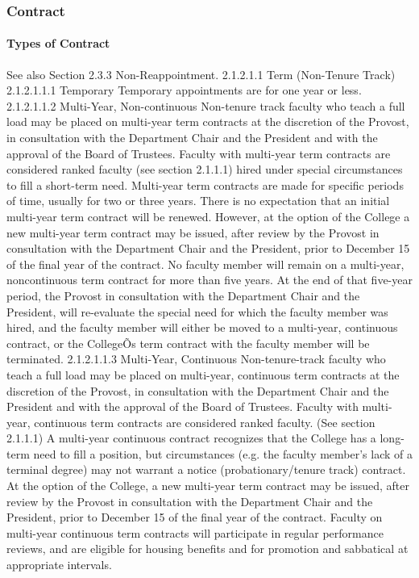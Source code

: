\documentclass[letterpaper, 11pt]{article}
\begin{document}
		\subsubsection{Contract}
			\paragraph{Types of Contract}
				See also Section 2.3.3 Non-Reappointment.
				2.1.2.1.1 Term (Non-Tenure Track)
				2.1.2.1.1.1 Temporary
				Temporary appointments are for one year or less.
				2.1.2.1.1.2 Multi-Year, Non-continuous
				Non-tenure track faculty who teach a full load may be placed on multi-year term contracts at the discretion of the Provost, in consultation with the Department Chair and the President and with the approval of the Board of Trustees.  Faculty with multi-year term contracts are considered ranked faculty (see section 2.1.1.1) hired under special circumstances to fill a short-term need.  Multi-year term contracts are made for specific periods of time, usually for two or three years.  There is no expectation that an initial multi-year term contract will be renewed.  However, at the option of the College a new multi-year term contract may be issued, after review by the Provost in consultation with the Department Chair and the President, prior to December 15 of the final year of the contract.  No faculty member will remain on a multi-year, noncontinuous term contract for more than five years.  At the end of that five-year period, the Provost in consultation with the Department Chair and the President, will re-evaluate the special need for which the faculty member was hired, and the faculty member will either be moved to a multi-year, continuous contract, or the CollegeÕs term contract with the faculty member will be terminated.
				2.1.2.1.1.3 Multi-Year, Continuous
				Non-tenure-track faculty who teach a full load may be placed on multi-year, continuous term contracts at the discretion of the Provost, in consultation with the Department Chair and the President and with the approval of the Board of Trustees. Faculty with multi-year, continuous term contracts are considered ranked faculty.  (See section 2.1.1.1)  A multi-year continuous contract recognizes that the College has a long-term need to fill a position, but circumstances (e.g. the faculty member's lack of a terminal degree) may not warrant a notice (probationary/tenure track) contract.  At the option of the College, a new multi-year term contract may be issued, after review by the Provost in consultation with the Department Chair and the President, prior to December 15 of the final year of the contract. Faculty on multi-year continuous term contracts will participate in regular performance reviews, and are eligible for housing benefits and for promotion and sabbatical at appropriate intervals.
\end{document}

